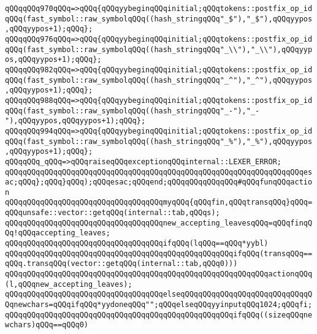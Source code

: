 \verb|qQQqqQQq970qQQq=>qQQq{qQQqyybeginqQQqinitial;qQQqtokens::postfix_op_idqQQq(fast_symbol::raw_symbolqQQq((hash_stringqQQq"_$"),"_$"),qQQqyypos,qQQqyypos+1);qQQq};|\newline
\verb|qQQqqQQq976qQQq=>qQQq{qQQqyybeginqQQqinitial;qQQqtokens::postfix_op_idqQQq(fast_symbol::raw_symbolqQQq((hash_stringqQQq"_\\"),"_\\"),qQQqyypos,qQQqyypos+1);qQQq};|\newline
\verb|qQQqqQQq982qQQq=>qQQq{qQQqyybeginqQQqinitial;qQQqtokens::postfix_op_idqQQq(fast_symbol::raw_symbolqQQq((hash_stringqQQq"_^"),"_^"),qQQqyypos,qQQqyypos+1);qQQq};|\newline
\verb|qQQqqQQq988qQQq=>qQQq{qQQqyybeginqQQqinitial;qQQqtokens::postfix_op_idqQQq(fast_symbol::raw_symbolqQQq((hash_stringqQQq"_-"),"_-"),qQQqyypos,qQQqyypos+1);qQQq};|\newline
\verb|qQQqqQQq994qQQq=>qQQq{qQQqyybeginqQQqinitial;qQQqtokens::postfix_op_idqQQq(fast_symbol::raw_symbolqQQq((hash_stringqQQq"_%"),"_%"),qQQqyypos,qQQqyypos+1);qQQq};|\newline
\verb|qQQqqQQq_qQQq=>qQQqraiseqQQqexceptionqQQqinternal::LEXER_ERROR;|\newline
\newline
\verb|qQQqqQQqqQQqqQQqqQQqqQQqqQQqqQQqqQQqqQQqqQQqqQQqqQQqqQQqqQQqqQQqqQQqesac;qQQq};qQQq}qQQq);qQQqesac;qQQqend;qQQqqQQqqQQqqQQq#qQQqfunqQQqaction|\newline
\newline
\verb|qQQqqQQqqQQqqQQqqQQqqQQqqQQqqQQqqQQqmyqQQq{qQQqfin,qQQqtransqQQq}qQQq=qQQqunsafe::vector::getqQQq(internal::tab,qQQqs);|\newline
\verb|qQQqqQQqqQQqqQQqqQQqqQQqqQQqqQQqqQQqnew_accepting_leavesqQQq=qQQqfinqQQq!qQQqaccepting_leaves;|\newline
\verb|qQQqqQQqqQQqqQQqqQQqqQQqqQQqqQQqqQQqifqQQq(lqQQq==qQQq*yybl)|\newline
\verb|qQQqqQQqqQQqqQQqqQQqqQQqqQQqqQQqqQQqqQQqqQQqqQQqqQQqifqQQq(transqQQq==qQQq.transqQQq(vector::getqQQq(internal::tab,qQQq0)))|\newline
\verb|qQQqqQQqqQQqqQQqqQQqqQQqqQQqqQQqqQQqqQQqqQQqqQQqqQQqqQQqqQQqactionqQQq(l,qQQqnew_accepting_leaves);|\newline
\verb|qQQqqQQqqQQqqQQqqQQqqQQqqQQqqQQqqQQqelseqQQqqQQqqQQqqQQqqQQqqQQqqQQqqQQqnewchars=qQQqifqQQq*yydoneqQQq"";qQQqelseqQQqyyinputqQQq1024;qQQqfi;|\newline
\verb|qQQqqQQqqQQqqQQqqQQqqQQqqQQqqQQqqQQqqQQqqQQqqQQqqQQqifqQQq((sizeqQQqnewchars)qQQq==qQQq0)|\newline

